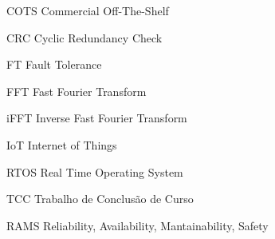 \listoffigures*
\cleardoublepage


\listofquadros*
\cleardoublepage
\listofequacao*
\cleardoublepage

\begin{siglas}
    \item[COTS] Commercial Off-The-Shelf
    \item[CRC]  Cyclic Redundancy Check
    \item[FT]   Fault Tolerance
    \item[FFT]  Fast Fourier Transform
    \item[iFFT] Inverse Fast Fourier Transform
    \item[IoT]  Internet of Things
    \item[RTOS] Real Time Operating System
    \item[TCC]  Trabalho de Conclusão de Curso
    \item[RAMS] Reliability, Availability, Mantainability, Safety
\end{siglas}


\tableofcontents*
\cleardoublepage
